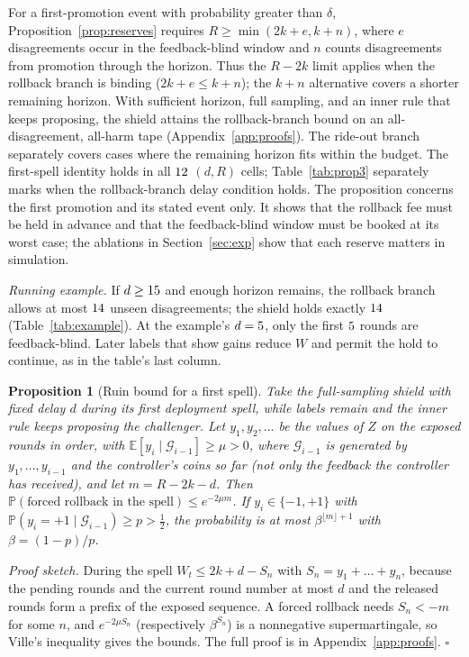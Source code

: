 \documentclass[10pt]{article}
\theoremstyle{plain}
\newtheorem{proposition}{Proposition}
\theoremstyle{definition}
\newcommand{\PP}{\mathbb{P}}
\newcommand{\E}{\mathbb{E}}
\begin{document}
For a first-promotion event with probability greater than $\delta$, Proposition~\ref{prop:reserves} requires $R\ge\min(2k+e,k+n)$, where $e$ disagreements occur in the feedback-blind window and $n$ counts disagreements from promotion through the horizon. Thus the $R-2k$ limit applies when the rollback branch is binding ($2k+e\le k+n$); the $k+n$ alternative covers a shorter remaining horizon. With sufficient horizon, full sampling, and an inner rule that keeps proposing, the shield attains the rollback-branch bound on an all-disagreement, all-harm tape (Appendix~\ref{app:proofs}). The ride-out branch separately covers cases where the remaining horizon fits within the budget. The first-spell identity holds in all $12{}$ $(d,R)$ cells; Table~\ref{tab:prop3} separately marks when the rollback-branch delay condition holds. The proposition concerns the first promotion and its stated event only. It shows that the rollback fee must be held in advance and that the feedback-blind window must be booked at its worst case; the ablations in Section~\ref{sec:exp} show that each reserve matters in simulation.

\emph{Running example.} If $d\ge15$ and enough horizon remains, the rollback branch allows at most $14$ unseen disagreements; the shield holds exactly $14$ (Table~\ref{tab:example}). At the example's $d=5$, only the first $5$ rounds are feedback-blind. Later labels that show gains reduce $W$ and permit the hold to continue, as in the table's last column.

\begin{samepage}
\begin{proposition}[Ruin bound for a first spell]\label{prop:price}
Take the full-sampling shield with fixed delay $d$ during its first deployment spell, while labels remain and the inner rule keeps proposing the challenger. Let $y_1,y_2,\dots$ be the values of $Z$ on the exposed rounds in order, with $\E[y_i\mid\mathcal G_{i-1}]\ge\mu>0$, where $\mathcal G_{i-1}$ is generated by $y_1,\dots,y_{i-1}$ and the controller's coins so far (not only the feedback the controller has received), and let $m=R-2k-d$. Then $\PP(\text{forced rollback in the spell})\le e^{-2\mu m}$. If $y_i\in\{-1,+1\}$ with $\PP(y_i=+1\mid\mathcal G_{i-1})\ge p>\tfrac12$, the probability is at most $\beta^{\lfloor m\rfloor+1}$ with $\beta=(1-p)/p$.
\end{proposition}
\end{samepage}
\emph{Proof sketch.} During the spell $W_t\le2k+d-S_n$ with $S_n=y_1+\dots+y_n$, because the pending rounds and the current round number at most $d$ and the released rounds form a prefix of the exposed sequence. A forced rollback needs $S_n<-m$ for some $n$, and $e^{-2\mu S_n}$ (respectively $\beta^{S_n}$) is a nonnegative supermartingale, so Ville's inequality gives the bounds. The full proof is in Appendix~\ref{app:proofs}. \hfill$\square$
\end{document}

